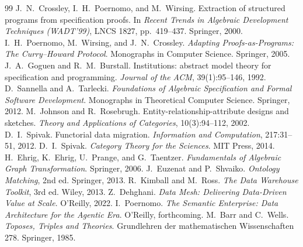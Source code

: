 \documentclass[11pt]{article}
\theoremstyle{plain}
\theoremstyle{definition}
\begin{document}
\begin{thebibliography}{99}
\small
{} J.~N.~Crossley, I.~H.~Poernomo, and M.~Wirsing. Extraction of structured programs from specification proofs. In \emph{Recent Trends in Algebraic Development Techniques (WADT'99)}, LNCS 1827, pp.\ 419--437. Springer, 2000.
 I.~H.~Poernomo, M.~Wirsing, and J.~N.~Crossley. \emph{Adapting Proofs-as-Programs: The Curry--Howard Protocol}. Monographs in Computer Science. Springer, 2005.
 J.~A.~Goguen and R.~M.~Burstall. Institutions: abstract model theory for specification and programming. \emph{Journal of the ACM}, 39(1):95--146, 1992.
 D.~Sannella and A.~Tarlecki. \emph{Foundations of Algebraic Specification and Formal Software Development}. Monographs in Theoretical Computer Science. Springer, 2012.
 M.~Johnson and R.~Rosebrugh. Entity-relationship-attribute designs and sketches. \emph{Theory and Applications of Categories}, 10(3):94--112, 2002.
 D.~I.~Spivak. Functorial data migration. \emph{Information and Computation}, 217:31--51, 2012.
 D.~I.~Spivak. \emph{Category Theory for the Sciences}. MIT Press, 2014.
 H.~Ehrig, K.~Ehrig, U.~Prange, and G.~Taentzer. \emph{Fundamentals of Algebraic Graph Transformation}. Springer, 2006.
 J.~Euzenat and P.~Shvaiko. \emph{Ontology Matching}, 2nd ed. Springer, 2013.
 R.~Kimball and M.~Ross. \emph{The Data Warehouse Toolkit}, 3rd ed. Wiley, 2013.
 Z.~Dehghani. \emph{Data Mesh: Delivering Data-Driven Value at Scale}. O'Reilly, 2022.
 I.~Poernomo. \emph{The Semantic Enterprise: Data Architecture for the Agentic Era}. O'Reilly, forthcoming.
 M.~Barr and C.~Wells. \emph{Toposes, Triples and Theories}. Grundlehren der mathematischen Wissenschaften 278. Springer, 1985.
\end{thebibliography}
\end{document}
